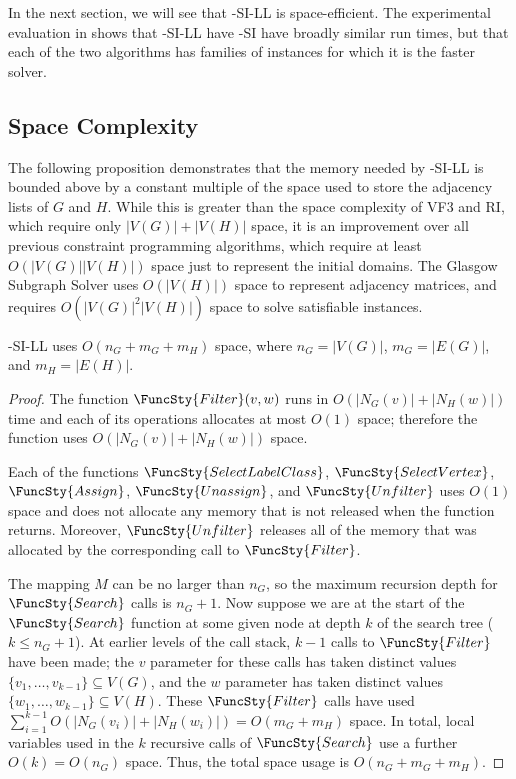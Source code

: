 In the next section, we will see that \McSplit-SI-LL is space-efficient.  The experimental evaluation
in  shows that \McSplit-SI-LL have \McSplit-SI have broadly
similar run times, but that each of the two algorithms has families of instances for which it is the faster
solver.

\subsection{Space Complexity}\label{sec:mcsplit-si-space-complexity}

The following proposition demonstrates that the memory needed by \McSplit-SI-LL
is bounded above by a constant multiple of the space used to store the adjacency
lists of $G$ and $H$.  While this is greater than the space complexity of 
VF3 and RI, which require only $|V(G)| + |V(H)|$ space, it is an improvement
over all previous constraint programming algorithms, which
require at least $O(|V(G)| |V(H)|)$ space just to represent
the initial domains.  The Glasgow Subgraph Solver uses $O(|V(H)|)$ space
to represent adjacency matrices, and requires $O(|V(G)|^2|V(H)|)$ space
to solve satisfiable instances.

\begin{proposition}\label{mcsplit-si-space}
    \McSplit-SI-LL uses $O(n_G + m_G + m_H)$ space, where
    $n_G=|V(G)|$,
    $m_G=|E(G)|$, and
    $m_H=|E(H)|$.
\end{proposition}

\begin{proof}
    The function $\FuncSty{Filter}(v,w)$ runs in $O(|N_G(v)| + |N_H(w)|)$ time
    and each of its operations allocates at most $O(1)$ space; therefore the
    function uses $O(|N_G(v)| + |N_H(w)|)$ space.

    Each of the functions
    $\FuncSty{SelectLabelClass}$,
    $\FuncSty{SelectVertex}$,
    $\FuncSty{Assign}$,
    $\FuncSty{Unassign}$,
    and
    $\FuncSty{Unfilter}$
    uses $O(1)$ space and does not allocate any memory that is not released
    when the function returns.  Moreover, $\FuncSty{Unfilter}$ releases
    all of the memory that was allocated by the corresponding call to $\FuncSty{Filter}$.

    The mapping $M$ can be no larger than $n_G$, so the maximum recursion depth for
    $\FuncSty{Search}$ calls is $n_G + 1$.  Now suppose we are at the start of the
    $\FuncSty{Search}$ function at some given node at depth $k$ of the search tree 
    ($k \leq n_G + 1$).  At earlier levels of the call stack, $k-1$ calls to $\FuncSty{Filter}$
    have been made; the $v$ parameter for these calls has taken distinct values
    $\{v_1, \dots, v_{k-1}\} \subseteq V(G)$, and the $w$ parameter has taken distinct values
    $\{w_1, \dots, w_{k-1}\} \subseteq V(H)$.  These $\FuncSty{Filter}$ calls have used
    $\sum_{i=1}^{k-1} O(|N_G(v_i)| + |N_H(w_i)|) = O(m_G + m_H)$ space.  In total,
    local variables used in the $k$
    recursive calls of $\FuncSty{Search}$ use a further $O(k) = O(n_G)$ space.  Thus,
    the total space usage is $O(n_G + m_G + m_H)$.
\end{proof}


